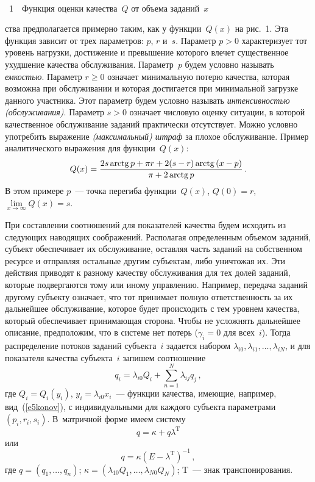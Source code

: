 \begin{multicols}{2}

\begin{center} %
\vspace*{-3pt}
\mbox{%
\epsfxsize=65.328mm
}
\vspace*{4pt}
\end{center}
\begin{center}
{{\figurename~1}\ \ \small{Функция оценки качества~$Q$ от объема заданий~$x$}}
\end{center}
\vspace*{12pt}


\addtocounter{figure}{1}

   
\noindent
ства 
предполагается примерно таким, как у функции~$Q(x)$ на рис.~1. Эта функция 
зависит от трех параметров: $p$, $r$ и~$s$. Параметр $p>0$ характеризует тот уровень 
нагрузки, достижение и превышение которого влечет существенное ухудшение качества 
обслуживания. Параметр~$p$ будем условно называть \textit{емкостью}. Параметр $r\geq 0$ 
означает минимальную потерю качества, которая возможна при обслуживании и которая 
достигается при минимальной загрузке данного участника. Этот параметр будем условно 
называть \textit{интенсивностью (обслуживания)}. Параметр $s>0$ означает числовую 
оценку ситуации, в которой качественное обслуживание заданий практически отсутствует. 
Можно условно употребить выражение \textit{(максимальный) штраф} за плохое 
обслуживание. Пример аналитического выражения для функции~$Q(x)$:
   \begin{equation}
   Q(x) =\displaystyle\frac{\displaystyle 2s \,\mathrm{arctg}\, p+\pi r+2(s-r)\,\mathrm{arctg}\,(x-p)\mathstrut}{\displaystyle \pi+2\,\mathrm{arctg}\, p\mathstrut}\,.
   \label{e5konov}
   \end{equation}
В этом примере $p$~--- точка перегиба функции~$Q(x)$, $Q(0) = r$,  
$\lim\limits_{x\rightarrow\infty} Q(x)=s$.
   
   При составлении соотношений для показателей качества будем исходить из следующих 
наводящих соображений. Располагая определенным объемом заданий, субъект обеспечивает 
их обслуживание, оставляя часть заданий на собственном ресурсе и отправляя остальные 
другим субъектам, либо уничтожая их. Эти действия приводят к разному качеству 
обслуживания для тех долей заданий, которые подвергаются тому или иному управлению. 
Например, передача заданий другому субъекту означает, что тот принимает полную 
ответственность за их дальнейшее обслуживание, которое будет происходить с тем уровнем 
качества, который обеспечивает принимающая сторона. Чтобы не усложнять дальнейшее 
описание, предположим, что в системе нет потерь ($\gamma_i=0$ для всех~$i$). Тогда 
распределение потоков заданий субъекта~$i$ задается набором 
$\lambda_{i0},\lambda_{i1},\ldots ,\lambda_{iN}$, и для показателя качества субъекта~$i$ 
запишем соотношение
   $$
   q_i=\lambda_{i0}Q_i+\sum\limits_{n=1}^N \lambda_{ij} q_j\,,
   $$
где $Q_i=Q_i(y_i)$, $y_i=\lambda_{i0}x_i$~--- функции качества,  имеющие, например, 
вид~(\ref{e5konov}), с индивидуальными для каждого субъекта параметрами $(p_i, r_i, s_i)$. 
В~мат\-рич\-ной форме имеем систему
$$
q=\kappa+q\lambda^{\mathrm{T}}
$$
или
$$
q=\kappa\left(E-\lambda^{\mathrm{T}}\right)^{-1}\,,
$$
где $q=(q_1,\ldots ,q_n)$; $\kappa=(\lambda_{10}Q_1,\ldots ,\lambda_{N0}Q_N)$; T~--- знак 
транспонирования.


\end{multicols}
